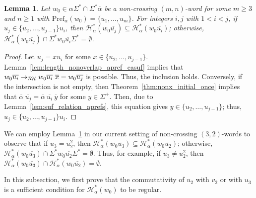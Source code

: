 \documentclass{article}
\theoremstyle{plain}
\newtheorem{lemma}{Lemma}
\theoremstyle{remark}
\newcommand{\RHC}{\ensuremath{\mathcal{R\hspace*{-0.5mm}H}}}
\newcommand{\HC}{\ensuremath{\mathcal{H}}}
\newcommand{\Pref}{\ensuremath{\mathrm{Pref}}}
\newcommand{\calpha}{\ensuremath{\overline{\alpha}}}
\begin{document}
\begin{lemma}\label{lem:mn_nonx_include_or_emptyset}
	Let $w_0 \in \alpha \Sigma^* \cap \Sigma^* \calpha$ be a non-crossing $(m, n)$-word for some $m \ge 3$ and $n \ge 1$ with $\Pref_\alpha(w_0) = \{u_1, \ldots, u_m\}$. 
	For integers $i, j$ with $1 < i < j$, if $u_j \in \{u_2, \ldots, u_{j-1}\}u_i$, then $\HC_\alpha^*(w_0 \overline{u_j}) \subseteq \HC_\alpha^*(w_0 \overline{u_i})$; otherwise, $\HC_\alpha^*(w_0 \overline{u_j}) \cap \Sigma^* w_0 \overline{u_i} \Sigma^* = \emptyset$. 
\end{lemma}
\begin{proof}
	Let $u_j = x u_i$ for some $x \in \{u_2, \ldots, u_{j-1}\}$.
	Lemma~\ref{lem:length_nonoverlap_apref_casuf} implies that $w_0 \overline{u_i} \to_{\RHC} w_0 \overline{u_i} \ \overline{x} = w_0 \overline{u_j}$ is possible. 
	Thus, the inclusion holds. 
	Conversely, if the intersection is not empty, then Theorem~\ref{thm:nonx_initial_once} implies that $\calpha \ \overline{u_j} = \calpha \ \overline{u_i} \ \overline{y}$ for some $y \in \Sigma^+$. 
	Then, due to Lemma~\ref{lem:suf_relation_aprefs}, this equation gives $y \in \{u_2, \ldots, u_{j-1}\}$; thus, $u_j \in \{u_2, \ldots, u_{j-1}\}u_i$. 
\end{proof}



We can employ Lemma~\ref{lem:mn_nonx_include_or_emptyset} in our current setting of non-crossing $(3, 2)$-words to observe that if $u_3 = u_2^2$, then $\HC_\alpha^*(w_0 \overline{u_3}) \subseteq \HC_\alpha^*(w_0 \overline{u_2})$; otherwise, $\HC_\alpha^*(w_0 \overline{u_3}) \cap \Sigma^* w_0 \overline{u_2} \Sigma^* = \emptyset$. 
Thus, for example, if $u_3 \neq u_2^2$, then $\HC_\alpha^*(w_0\overline{u_3}) \cap \HC_\alpha^*(w_0 \overline{u_2}) = \emptyset$. 

In this subsection, we first prove that the commutativity of $u_2$ with $v_2$ or with $u_3$ is a sufficient condition for $\HC_\alpha^*(w_0)$ to be regular. 
\end{document}
